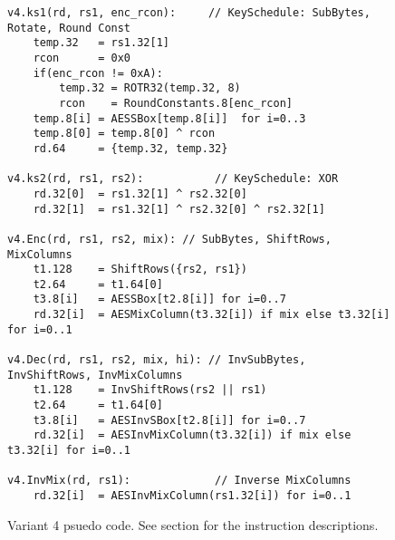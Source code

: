 %

\begin{figure}[!htb]
\begin{lstlisting}[language=pseudo,style=block]
v4.ks1(rd, rs1, enc_rcon):     // KeySchedule: SubBytes, Rotate, Round Const
    temp.32   = rs1.32[1]
    rcon      = 0x0
    if(enc_rcon != 0xA):
        temp.32 = ROTR32(temp.32, 8)
        rcon    = RoundConstants.8[enc_rcon]
    temp.8[i] = AESSBox[temp.8[i]]  for i=0..3
    temp.8[0] = temp.8[0] ^ rcon
    rd.64     = {temp.32, temp.32}

v4.ks2(rd, rs1, rs2):           // KeySchedule: XOR
    rd.32[0]  = rs1.32[1] ^ rs2.32[0]
    rd.32[1]  = rs1.32[1] ^ rs2.32[0] ^ rs2.32[1]

v4.Enc(rd, rs1, rs2, mix): // SubBytes, ShiftRows, MixColumns
    t1.128    = ShiftRows({rs2, rs1})
    t2.64     = t1.64[0]
    t3.8[i]   = AESSBox[t2.8[i]] for i=0..7
    rd.32[i]  = AESMixColumn(t3.32[i]) if mix else t3.32[i] for i=0..1

v4.Dec(rd, rs1, rs2, mix, hi): // InvSubBytes, InvShiftRows, InvMixColumns
    t1.128    = InvShiftRows(rs2 || rs1)
    t2.64     = t1.64[0]
    t3.8[i]   = AESInvSBox[t2.8[i]] for i=0..7
    rd.32[i]  = AESInvMixColumn(t3.32[i]) if mix else t3.32[i] for i=0..1

v4.InvMix(rd, rs1):             // Inverse MixColumns
    rd.32[i]  = AESInvMixColumn(rs1.32[i]) for i=0..1
\end{lstlisting}
\caption{
    Variant 4 psuedo code.
    See section  for the instruction
    descriptions.
}
\label{fig:pseudo:v4}
\end{figure}

%

